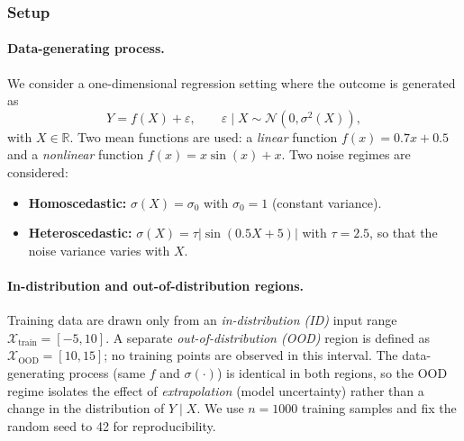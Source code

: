 
\subsubsection{Setup}
\label{sec:reg-ood-setup}

\paragraph{Data-generating process.}
We consider a one-dimensional regression setting where the outcome is generated as
\begin{equation}
  Y = f(X) + \varepsilon, \qquad \varepsilon \mid X \sim \mathcal{N}(0, \sigma^2(X)),
\end{equation}
with $X \in \mathbb{R}$. Two mean functions are used: a \emph{linear} function $f(x) = 0.7x + 0.5$ and a \emph{nonlinear} function $f(x) = x\sin(x) + x$. Two noise regimes are considered:
\begin{itemize}
  \item \textbf{Homoscedastic:} $\sigma(X) = \sigma_0$ with $\sigma_0 = 1$ (constant variance).
  \item \textbf{Heteroscedastic:} $\sigma(X) = \tau \bigl\lvert \sin(0.5 X + 5) \bigr\rvert$ with $\tau = 2.5$, so that the noise variance varies with $X$.
\end{itemize}

\paragraph{In-distribution and out-of-distribution regions.}
Training data are drawn only from an \emph{in-distribution (ID)} input range $\mathcal{X}_{\text{train}} = [-5, 10]$. A separate \emph{out-of-distribution (OOD)} region is defined as $\mathcal{X}_{\text{OOD}} = [10, 15]$; no training points are observed in this interval. The data-generating process (same $f$ and $\sigma(\cdot)$) is identical in both regions, so the OOD regime isolates the effect of \emph{extrapolation} (model uncertainty) rather than a change in the distribution of $Y \mid X$. We use $n = 1000$ training samples and fix the random seed to 42 for reproducibility.

